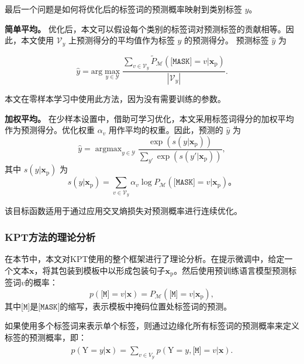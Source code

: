 最后一个问题是如何将优化后的标签词的预测概率映射到类别标签 $y$。

\textbf{简单平均。} 优化后，本文可以假设每个类别的标签词对预测标签的贡献相等。因此，本文使用 $\mathcal{V}_y$ 上预测得分的平均值作为标签 $y$ 的预测得分。
预测标签 $\hat{y}$ 为

\begin{equation}
\hat{y}\!=\!
    \mathrm{arg}\!\max_{y\in\mathcal{Y}}\frac{\sum_{v \in \mathcal{V}_{y}}\! \tilde{P}_{\mathcal{M}}(\!\texttt{[MASK]}=v|\mathbf{x}_{\text{p}})}{|\mathcal{V}_y|}.
\end{equation}

本文在零样本学习中使用此方法，因为没有需要训练的参数。

\textbf{加权平均。} 在少样本设置中，借助可学习优化，本文采用标签词得分的加权平均作为预测得分。优化权重 $\alpha_v$ 用作平均的权重。因此，预测的 $\hat{y}$ 为
\begin{equation}
\hat{y} \!= \operatorname{argmax}_{y\in\mathcal{Y}} \frac{\exp\left({s(y|\mathbf{x}_{\text{p}})}\right)}{\sum_{y'}\exp\left({s({y'}|\mathbf{x}_{\text{p}})}\right)},
\end{equation}
其中 $s(y|\mathbf{x}_{\text{p}})$ 为
\begin{equation}
        s(y|\mathbf{x}_{\text{p}})\!=\!\! \sum_{v\in\mathcal{V}_y} \!\!\alpha_v  \operatorname{log}{P}_{\mathcal{M}}(\texttt{[MASK]}\!\!\!=\!v|\mathbf{x}_{\text{p}})。
\end{equation}

该目标函数适用于通过应用交叉熵损失对预测概率进行连续优化。


\subsubsection{KPT方法的理论分析}

在本节中，本文对KPT使用的整个框架进行了理论分析。在提示微调中，给定一个文本$\mathbf{x}$，将其包装到模板中以形成包装句子$\mathbf{x}_{\text{p}}$。然后使用预训练语言模型预测标签词$v$的概率：
\begin{equation}
    p(\texttt{[M]}\!\!\!=\!v|\mathbf{x}) = P_{\mathcal{M}}(\texttt{[M]}\!\!\!=\!v|\mathbf{x}_{\text{p}}),
\end{equation}
其中$\texttt{[M]}$是$\texttt{[MASK]}$的缩写，表示模板中掩码位置处标签词的预测。

如果使用多个标签词来表示单个标签，则通过边缘化所有标签词的预测概率来定义标签的预测概率，即：
\begin{align}
\begin{split}
  p(\text{Y}\!=\!y|\mathbf{x}) \!=\!\! \sum_{v\in V_{\mathcal{Y}}} p(\text{Y}\!=\!y, \texttt{[M]}\!\!\!=\!v|\mathbf{x}).
\end{split}
\label{appequ_1}
\end{align}

